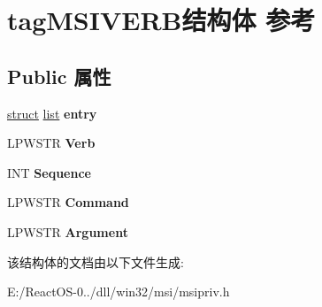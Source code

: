 \hypertarget{structtag_m_s_i_v_e_r_b}{}\section{tag\+M\+S\+I\+V\+E\+R\+B结构体 参考}
\label{structtag_m_s_i_v_e_r_b}
\subsection*{Public 属性}
\begin{DoxyCompactItemize}
\item 
\mbox{\label{structtag_m_s_i_v_e_r_b_a7933b60e0dd554bbaad6ec999ea3e07d}} 
\hyperlink{interfacestruct}{struct} \hyperlink{classlist}{list} {\bfseries entry}
\item 
\mbox{\label{structtag_m_s_i_v_e_r_b_aa1cd41671db98653620f039e129a3ca5}} 
L\+P\+W\+S\+TR {\bfseries Verb}
\item 
\mbox{\label{structtag_m_s_i_v_e_r_b_a69f1235e129ffd22bd4880bdb2455581}} 
I\+NT {\bfseries Sequence}
\item 
\mbox{\label{structtag_m_s_i_v_e_r_b_a541316918aad8ef81592ab206a88b79b}} 
L\+P\+W\+S\+TR {\bfseries Command}
\item 
\mbox{\label{structtag_m_s_i_v_e_r_b_a86dfc99b374868106d653880f895695f}} 
L\+P\+W\+S\+TR {\bfseries Argument}
\end{DoxyCompactItemize}


该结构体的文档由以下文件生成\+:\begin{DoxyCompactItemize}
\item 
E\+:/\+React\+O\+S-\/0../dll/win32/msi/msipriv.\+h\end{DoxyCompactItemize}
